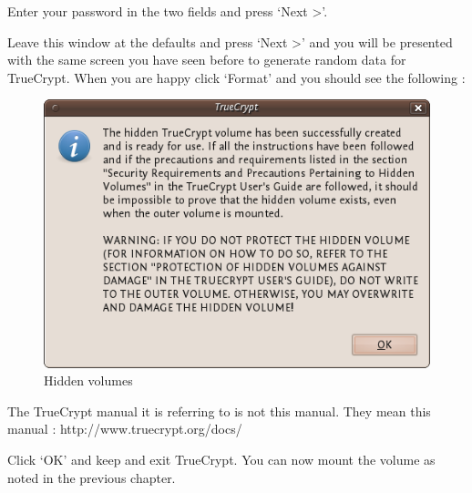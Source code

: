 Enter your password in the two fields and press `Next \textgreater{}'.

Leave this window at the defaults and press `Next \textgreater{}' and
you will be presented with the same screen you have seen before to
generate random data for TrueCrypt. When you are happy click `Format'
and you should see the following :

\begin{figure}[htbp]
\centering
\includegraphics{hidden_vol_014.png}
\caption{Hidden volumes}
\end{figure}

The TrueCrypt manual it is referring to is not this manual. They mean
this manual : http://www.truecrypt.org/docs/

Click `OK' and keep and exit TrueCrypt. You can now mount the volume as
noted in the previous chapter.

